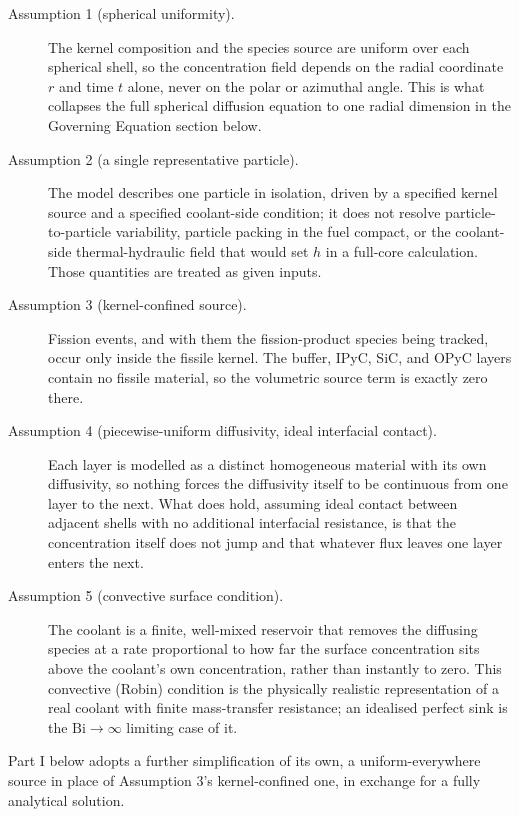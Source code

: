 \documentclass[11pt,a4paper]{article}
\newcommand{\Bi}{\mathrm{Bi}}
\begin{document}
\begin{description}
  \item[Assumption 1 (spherical uniformity).] The kernel composition and the
  species source are uniform over each spherical shell, so the concentration
  field depends on the radial coordinate $r$ and time $t$ alone, never on the
  polar or azimuthal angle. This is what collapses the full spherical
  diffusion equation to one radial dimension in the Governing Equation
  section below.
  \item[Assumption 2 (a single representative particle).] The model
  describes one particle in isolation, driven by a specified kernel source
  and a specified coolant-side condition; it does not resolve
  particle-to-particle variability, particle packing in the fuel compact, or
  the coolant-side thermal-hydraulic field that would set $h$ in a
  full-core calculation. Those quantities are treated as given inputs.
  \item[Assumption 3 (kernel-confined source).] Fission events, and with them
  the fission-product species being tracked, occur only inside the fissile
  kernel. The buffer, IPyC, SiC, and OPyC layers contain no fissile
  material, so the volumetric source term is exactly zero there.
  \item[Assumption 4 (piecewise-uniform diffusivity, ideal interfacial
  contact).] Each layer is modelled as a distinct homogeneous material with
  its own diffusivity, so nothing forces the diffusivity itself to be
  continuous from one layer to the next. What does hold, assuming ideal
  contact between adjacent shells with no additional interfacial resistance,
  is that the concentration itself does not jump and that whatever flux
  leaves one layer enters the next.
  \item[Assumption 5 (convective surface condition).] The coolant is a
  finite, well-mixed reservoir that removes the diffusing species at a rate
  proportional to how far the surface concentration sits above the
  coolant's own concentration, rather than instantly to zero. This
  convective (Robin) condition is the physically realistic representation of
  a real coolant with finite mass-transfer resistance; an idealised perfect
  sink is the $\Bi\to\infty$ limiting case of it.
\end{description}

Part I below adopts a further simplification of its own, a
uniform-everywhere source in place of Assumption 3's kernel-confined one, in
exchange for a fully analytical solution.
\clearpage
\end{document}

